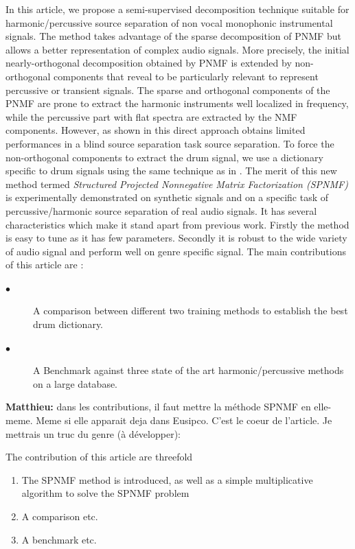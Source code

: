 \documentclass[journal]{IEEEtran}
\def\MK{\color{blue} {\bf Matthieu:} }
\begin{document}
In this article, we propose a semi-supervised decomposition technique suitable for harmonic/percussive source separation of non vocal monophonic instrumental signals. The method takes advantage of the sparse decomposition of PNMF but allows a better representation of complex audio signals. More precisely, the initial nearly-orthogonal decomposition obtained by PNMF is extended by non-orthogonal components that reveal to be particularly relevant to represent percussive or transient signals. The sparse and orthogonal components of the PNMF are prone to extract the harmonic instruments well localized in frequency, while the percussive part with flat spectra are extracted by the NMF components. However, as shown in \cite{laroche2015structured} this direct approach obtains limited performances in a blind source separation task source separation. To force the non-orthogonal components to extract the drum signal, we use a dictionary specific to drum signals using the same technique as in \cite{wudrum}.
The merit of this new method termed \textit{Structured Projected Nonnegative Matrix Factorization (SPNMF)} is experimentally demonstrated on synthetic signals and on a specific task of percussive/harmonic source separation of real audio signals. It has several characteristics which make it stand apart from previous work. Firstly the method is easy to tune as it has few parameters. Secondly it is robust to the wide variety of audio signal and perform well on genre specific signal. The main contributions of this article are :
\begin{description}
\item[$\bullet$ ] A comparison between different two training methods to establish the best drum dictionary.
\item[$\bullet$ ] A Benchmark against three state of the art harmonic/percussive methods on a large database.
\end{description}
{\MK dans les contributions, il faut mettre la méthode SPNMF en elle-meme. Meme si elle apparait deja dans Eusipco. C'est le coeur de l'article. Je mettrais un truc du genre (à développer):


The contribution of this article are threefold
\begin{enumerate}
\item The SPNMF method is introduced, as well as a simple multiplicative algorithm to solve the SPNMF problem
\item A comparison etc.
\item A benchmark etc.	
\end{enumerate}

}
\end{document}

